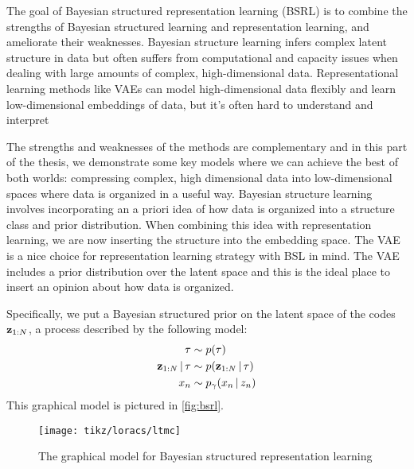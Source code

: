 The goal of Bayesian structured
representation learning (BSRL)
is to combine the
strengths of
Bayesian structured learning
and representation learning,
and ameliorate their weaknesses.
Bayesian structure learning
infers complex latent structure
in data but often suffers from
computational and capacity issues
when dealing with large amounts of
complex, high-dimensional data.
Representational learning methods
like VAEs can model high-dimensional
data flexibly and learn low-dimensional
embeddings of data,
but it's often hard to understand 
and interpret

The strengths and weaknesses of
the methods are complementary
and in this part of the thesis, we demonstrate
some key models where we can
achieve the best of both worlds:
compressing complex, high dimensional
data into low-dimensional spaces
where data is organized in a useful way.
Bayesian structure learning
involves incorporating an a priori
idea of how data is organized
into a structure class and
prior distribution.
When combining this idea with representation
learning, we are now inserting
the structure into the embedding space.
The VAE is a nice choice
for representation learning strategy
with BSL in mind. The VAE includes
a prior distribution over the latent space
and this is the ideal place to
insert an opinion about
how data is organized.

Specifically, we put a Bayesian structured prior
on the latent space of the codes $\mathbf{z}_{1:N}$,
a process described by the following model:
\begin{align*}
    \tau &\sim p(\tau) \\
    \mathbf{z}_{1:N} \,|\, \tau &\sim p(\mathbf{z}_{1:N} \,|\, \tau) \\
    x_n &\sim p_\gamma(x_n \,|\, z_n)
\end{align*}
This graphical model is pictured in 
\autoref{fig:bsrl}.

\begin{figure}[H]
    \centering
    \texttt{[image: tikz/loracs/ltmc]}
    \caption{The graphical model for
    Bayesian structured representation learning}
    \label{fig:bsrl}
\end{figure}

